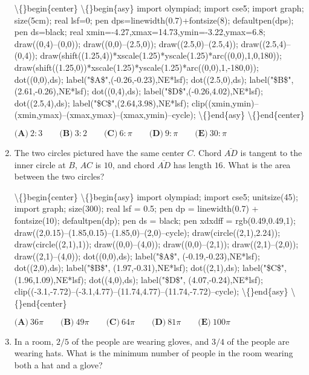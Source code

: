 \documentclass{article}
\begin{document}
\begin{enumerate}[label=\arabic*., itemsep=0.5em]
\textbackslash\{\}begin\{center\}
\textbackslash\{\}begin\{asy\}
import olympiad;
import cse5;
import graph; size(5cm); real lsf=0; pen dps=linewidth(0.7)+fontsize(8); defaultpen(dps); pen ds=black; real xmin=-4.27,xmax=14.73,ymin=-3.22,ymax=6.8; draw((0,4)--(0,0)); draw((0,0)--(2.5,0)); draw((2.5,0)--(2.5,4)); draw((2.5,4)--(0,4)); draw(shift((1.25,4))*xscale(1.25)*yscale(1.25)*arc((0,0),1,0,180)); draw(shift((1.25,0))*xscale(1.25)*yscale(1.25)*arc((0,0),1,-180,0));
dot((0,0),ds); label("\$A\$",(-0.26,-0.23),NE*lsf); dot((2.5,0),ds); label("\$B\$",(2.61,-0.26),NE*lsf); dot((0,4),ds); label("\$D\$",(-0.26,4.02),NE*lsf); dot((2.5,4),ds); label("\$C\$",(2.64,3.98),NE*lsf);
clip((xmin,ymin)--(xmin,ymax)--(xmax,ymax)--(xmax,ymin)--cycle);
\textbackslash\{\}end\{asy\}
\textbackslash\{\}end\{center\}


\( \textbf{(A)}\ 2:3 \qquad\textbf{(B)}\ 3:2\qquad\textbf{(C)}\ 6:\pi \qquad\textbf{(D)}\ 9: \pi \qquad\textbf{(E)}\ 30 : \pi\)\par \vspace{0.5em}\item The two circles pictured have the same center \(C\). Chord \(\overline{AD}\) is tangent to the inner circle at \(B\), \(AC\) is \(10\), and chord \(\overline{AD}\) has length \(16\). What is the area between the two circles?


\textbackslash\{\}begin\{center\}
\textbackslash\{\}begin\{asy\}
import olympiad;
import cse5;
unitsize(45);
import graph; size(300); real lsf = 0.5; pen dp = linewidth(0.7) + fontsize(10); defaultpen(dp); pen ds = black; pen xdxdff = rgb(0.49,0.49,1);
draw((2,0.15)--(1.85,0.15)--(1.85,0)--(2,0)--cycle); draw(circle((2,1),2.24)); draw(circle((2,1),1)); draw((0,0)--(4,0)); draw((0,0)--(2,1)); draw((2,1)--(2,0)); draw((2,1)--(4,0));
dot((0,0),ds); label("\$A\$", (-0.19,-0.23),NE*lsf); dot((2,0),ds); label("\$B\$", (1.97,-0.31),NE*lsf); dot((2,1),ds); label("\$C\$", (1.96,1.09),NE*lsf); dot((4,0),ds); label("\$D\$", (4.07,-0.24),NE*lsf); clip((-3.1,-7.72)--(-3.1,4.77)--(11.74,4.77)--(11.74,-7.72)--cycle);
\textbackslash\{\}end\{asy\}
\textbackslash\{\}end\{center\}


\( \textbf{(A)}\ 36 \pi \qquad\textbf{(B)}\ 49 \pi\qquad\textbf{(C)}\ 64 \pi\qquad\textbf{(D)}\ 81 \pi\qquad\textbf{(E)}\ 100 \pi \)\par \vspace{0.5em}\item In a room, \(2/5\) of the people are wearing gloves, and \(3/4\) of the people are wearing hats. What is the minimum number of people in the room wearing both a hat and a glove? 


\end{enumerate}
\end{document}
